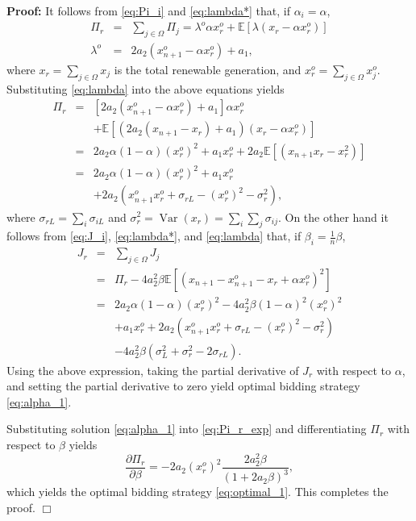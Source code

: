 \documentclass[journal]{IEEEtran}
\begin{document}
\noindent \textbf{Proof:} It follows from \eqref{eq:Pi_i} and \eqref{eq:lambda*} that, if $\alpha_i=\alpha$, 
\begin{eqnarray*}
\Pi_r & = & \sum_{j\in\Omega} \Pi_j = \lambda^o \alpha x_r^o +  \mathbb{E}[\lambda (x_r-\alpha x_r^o)] \\
 \lambda^o   & = & 2a_2\left(x_{n+1}^o-\alpha x_r^o \right) +a_1,
\end{eqnarray*}
where $x_r = \sum_{j\in\Omega} x_j$ is the total renewable generation, and $x_r^o = \sum_{j\in\Omega} x_j^o$. Substituting \eqref{eq:lambda} into the above equations yields
\begin{eqnarray}
\Pi_r & = &  [2a_2\left(x_{n+1}^o-\alpha x_r^o \right) +a_1] \alpha x_r^o \nonumber \\
&& + \mathbb{E}[(2a_2\left(x_{n+1}-x_r \right) + a_1)(x_r-\alpha x_r^o)] \nonumber \\
  & = & 2a_2\alpha(1-\alpha)(x_r^o)^2 +a_1x_r^o  + 2a_2\mathbb{E}[\left(x_{n+1}x_r-x_r^2 \right)] \nonumber\\
   & = & 2a_2\alpha(1-\alpha)(x_r^o)^2 +a_1x_r^o \nonumber \\
   && + 2a_2\left(x_{n+1}^ox_r^o+\sigma_{rL}-(x_r^o)^2-\sigma_r^2 \right), \label{eq:Pi_r_exp}
\end{eqnarray}
where $\sigma_{rL}=\sum_i\sigma_{iL}$ and $\sigma_r^2=\operatorname{Var}(x_r)=\sum_i\sum_j\sigma_{ij}$.
On the other hand it follows from \eqref{eq:J_i}, \eqref{eq:lambda*}, and \eqref{eq:lambda} that, if $\beta_i = \frac{1}{n}\beta$,
\begin{eqnarray*}
J_r & = & \sum_{j\in\Omega} J_j \\
 & = & \Pi_r  - 4a_2^2 \beta \mathbb{E}[(x_{n+1}-x_{n+1}^o -x_r +\alpha x_r^o)^2] \\
 & = & 2a_2\alpha(1-\alpha)(x_r^o)^2  - 4a_2^2  \beta  (1-\alpha)^2 (x_r^o)^2 \\
 & & +a_1x_r^o + 2a_2\left(x_{n+1}^ox_r^o+\sigma_{rL}-(x_r^o)^2-\sigma_r^2 \right)\\
 && - 4a_2^2  \beta (\sigma_L^2+\sigma_r^2 - 2\sigma_{rL}). 
\end{eqnarray*}
Using the above expression, taking the partial derivative of $J_r$ with respect to $\alpha$, and setting the partial derivative to zero yield optimal bidding strategy \eqref{eq:alpha_1}. 

Substituting solution \eqref{eq:alpha_1} into 
\eqref{eq:Pi_r_exp} and differentiating $\Pi_r$ with respect to $\beta$ yields
\[ \frac{\partial \Pi_r}{\partial \beta} = - 2a_2(x_r^o)^2\frac{2a_2^2\beta}{(1+2a_2\beta)^3}, \]
which yields the optimal bidding strategy \eqref{eq:optimal_1}. This completes the proof. \hfill $\Box$
\end{document}
